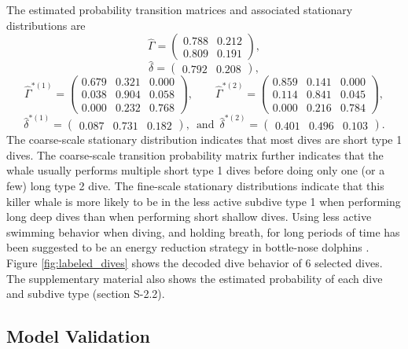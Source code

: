 The estimated probability transition matrices and associated stationary distributions are
%
$$\hat \Gamma = \begin{pmatrix} 
0.788 & 0.212 \\
0.809 & 0.191
\end{pmatrix},$$
$$\hat \delta = \begin{pmatrix} 0.792 & 0.208 \end{pmatrix},$$
%
$$\hat \Gamma^{*(1)} = \begin{pmatrix} 
0.679 & 0.321 & 0.000 \\
0.038 & 0.904 & 0.058 \\
0.000 & 0.232 & 0.768
\end{pmatrix}, \qquad 
\hat \Gamma^{*(2)} = \begin{pmatrix} 
0.859 & 0.141 & 0.000 \\
0.114 & 0.841 & 0.045 \\
0.000 & 0.216 & 0.784
\end{pmatrix},$$
$$\hat \delta^{*(1)} = \begin{pmatrix} 0.087 & 0.731 & 0.182 \end{pmatrix}, \enspace \text{and} \enspace \hat \delta^{*(2)} = \begin{pmatrix} 0.401 & 0.496 & 0.103 \end{pmatrix}.$$
%
The coarse-scale stationary distribution indicates that most dives are short type 1 dives. The coarse-scale transition probability matrix further indicates that the whale usually performs multiple short type 1 dives before doing only one (or a few) long type 2 dive. The fine-scale stationary distributions indicate that this killer whale is more likely to be in the less active subdive type 1 when performing long deep dives than when performing short shallow dives. Using less active swimming behavior when diving, and holding breath, for long periods of time has been suggested to be an energy reduction strategy in bottle-nose dolphins \citep{Williams:1999}. Figure \ref{fig:labeled_dives} shows the decoded dive behavior of 6 selected dives. The supplementary material also shows the estimated probability of each dive and subdive type (section S-2.2).

\subsection{Model Validation}
\label{subsec:model_validation}

